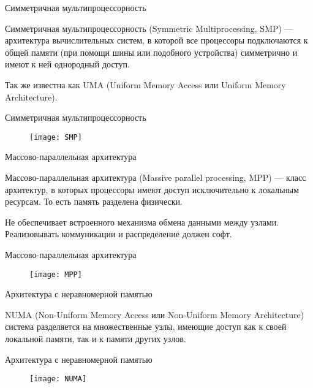 \begin{frame}{Симметричная мультипроцессорность}

Симметричная мультипроцессорность (\abbr Symmetric Multiprocessing, SMP) --- архитектура вычислительных систем, в которой все процессоры подключаются к общей памяти (при помощи шины или подобного устройства) симметрично и имеют к ней однородный доступ.

Так же известна как UMA (Uniform Memory Access или Uniform Memory Architecture).

\end{frame}

\begin{frame}{Симметричная мультипроцессорность}

\begin{figure}[htp]
    \centering
    \texttt{[image: SMP]}
\end{figure}

\end{frame}

\begin{frame}{Массово-параллельная архитектура}

Массово-параллельная архитектура (\abbr Massive parallel processing, MPP) --- класс архитектур, в которых процессоры имеют доступ исключительно к локальным ресурсам. То есть память разделена физически.

Не обеспечивает встроенного механизма обмена данными между узлами. Реализовывать коммуникации и распределение должен софт.

\end{frame}

\begin{frame}{Массово-параллельная архитектура}

\begin{figure}[htp]
    \centering
    \texttt{[image: MPP]}
\end{figure}

\end{frame}

\begin{frame}{Архитектура с неравномерной памятью}

NUMA (Non-Uniform Memory Access или Non-Uniform Memory Architecture) система разделяется на множественные узлы, имеющие доступ как к своей локальной памяти, так и к памяти других узлов.

\end{frame}

\begin{frame}{Архитектура с неравномерной памятью}

\begin{figure}[htp]
    \centering
    \texttt{[image: NUMA]}
\end{figure}

\end{frame}

